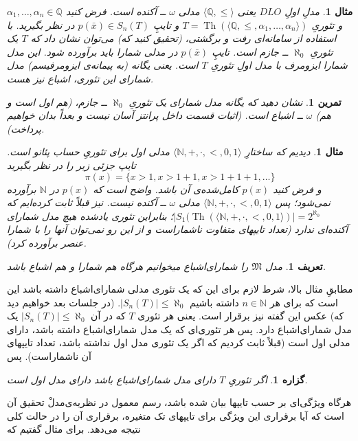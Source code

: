 \documentclass[12pt,a4paper]{report}
\theoremstyle{colorhead}
\newtheorem{tam}{تمرین}
\newtheorem{mesal}[thm]{مثال}
\newtheorem{prop}[thm]{گزاره}
\newtheorem{defn}[thm]{تعریف}
\DeclareMathOperator{\Th}{Th}
\begin{document}
\begin{mesal}
مدلِ اولِ 
$DLO$
یعنی
$\langle \mathbb{Q},\leq\rangle$
مدلی
$\omega$ ــ
آکنده است. فرض کنید
$\alpha_1,\ldots,\alpha_n\in \mathbb{Q}$
و
تئوریِ
$T=\Th(\langle \mathbb{Q},\leq,\alpha_1,\ldots,\alpha_n\rangle)$
و تایپِ
$p(\bar{x})\in S_n(T)$
 در نظر بگیرید. با استفاده از سامانه‌ای رفت و برگشتی، (تحقیق کنید که) می‌توان نشان داد که
 $T$
 یک تئوریِ
 $\aleph_0$
 ــ
 جازم است.
تایپِ
$p(\bar{x})$
در مدلی شمارا باید برآورده شود. این مدل شمارا ایزومرف با مدل اولِ تئوریِ
$T$
است. یعنی یگانه 
(به پیمانه‌ی ایزومرفیسم)‌
مدل  شمارای این تئوری، اشباع 
 نیز هست. 
\end{mesal}
\begin{tam}
نشان دهید که یگانه مدل شمارای یک تئوریِ
$\aleph_0$ ــ
جازم، (هم اول است و هم) 
$\omega$ ــ
اشباع است. (اثبات قسمت داخل پرانتز آسان نیست و بعداً بدان خواهیم پرداخت).
\end{tam}
\begin{mesal}
دیدیم که ساختارِ
$\langle \mathbb{N},+,\cdot,<,0,1\rangle$
مدلی اول برای تئوریِ
حساب پئانو است. تایپ جزئی زیر را در نظر بگیرید
\[
\pi(x)=\{x>1,x>1+1,x>1+1+1,\ldots\}
\]
و فرض کنید
$p(x)$
کامل‌شده‌ی آن باشد. واضح است که 
$p(x)$
در
$\mathbb{N}$
برآورده نمی‌شود؛ پس
$\langle \mathbb{N},+,\cdot,<,0,1\rangle$
مدلی 
$\omega$ ــ
آکنده نیست.  نیز قبلاً ثابت کرده‌ایم که 
\mbox{$|S_1(\Th(\langle \mathbb{N},+,\cdot,<,0,1\rangle)|=2^{\aleph_0}$؛}
بنابراین تئوری یادشده هیچ مدل 
شمارای آکنده‌ای  ندارد (تعداد تایپهای متفاوت ناشماراست و از این رو نمی‌توان آنها را با  شمارا عنصر برآورده کرد).
\end{mesal}
\begin{defn}
مدل
$\mathfrak{M}$
را شمارای‌اشباع
 میخوانیم هرگاه هم شمارا و هم اشباع باشد. 
\end{defn}
مطابقِ مثال بالا، شرط لازم برای این که یک تئوری مدلی شمارای‌اشباع داشته باشد این است که برای هر
$n\in \mathbb{N}$
داشته باشیم
$|S_n(T)|\leq \aleph_0$.
(در جلسات بعد خواهیم دید که)
عکس این گفته نیز برقرار است. یعنی هر تئوری 
$T$
که در آن
$|S_n(T)|\leq \aleph_0$
یک مدل شمارای‌اشباع دارد. پس هر تئوری‌ای که یک مدل شمارای‌اشباع داشته باشد، 
دارای مدلی اول است (قبلاً ثابت کردیم که اگر یک تئوری
مدل اول نداشته باشد، تعداد تایپهای آن ناشماراست). پس
\begin{prop}
اگر
تئوریِ
$T$
دارای مدل شمارای‌اشباع باشد 
دارای مدل اول است.
\end{prop}
هرگاه ویژگی‌ای بر حسب تایپها بیان شده باشد، 
رسم معمول در نظریه‌ی‌مدلْ تحقیق آن است که
آیا
برقراری این ویژگی 
برای تایپهای تک متغیره، برقراری آن را در حالت کلی  نتیجه می‌دهد. برای مثال گفتیم که
\end{document}
